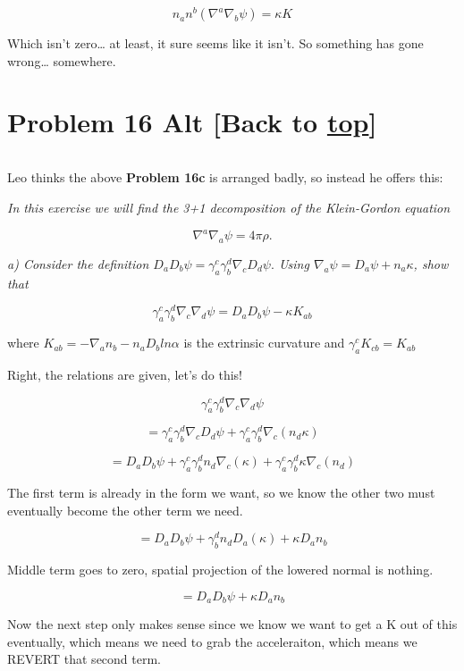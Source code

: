 \documentclass[landscape,letterpaper,10pt,english]{article}
\begin{document}
\[ n_a n^b (\nabla^a\nabla_b \psi) = \kappa K\]

Which isn't zero\ldots{} at least, it sure seems like it isn't. So
something has gone wrong\ldots{} somewhere.

    \hypertarget{problem-16-alt-back-to-top}{%
\section{\texorpdfstring{Problem 16 Alt {[}Back to
\hyperref[toc]{top}{]}}{Problem 16 Alt {[}Back to {]}}}\label{problem-16-alt-back-to-top}}

\[\label{P16A}\]

Leo thinks the above \textbf{Problem 16c} is arranged badly, so instead
he offers this:

    \emph{In this exercise we will find the 3+1 decomposition of the
Klein-Gordon equation}

\[ \nabla^a\nabla_a\psi = 4\pi \rho .\]

\emph{a) Consider the definition
\(D_aD_b\psi = \gamma^c_a\gamma^d_b\nabla_cD_d\psi.\) Using
\(\nabla_a\psi = D_a\psi + n_a \kappa\), show that}

\[ \gamma^c_a \gamma^d_b \nabla_c \nabla_d \psi = D_a D_b \psi - \kappa K_{ab} \]

where \(K_{ab} = -\nabla_an_b - n_aD_b ln\alpha\) is the extrinsic
curvature and \(\gamma^c_a K_{cb} = K_{ab}\)

    Right, the relations are given, let's do this!

\[ \gamma^c_a \gamma^d_b \nabla_c \nabla_d \psi \]

\[ = \gamma^c_a \gamma^d_b \nabla_c D_d \psi + \gamma^c_a \gamma^d_b \nabla_c (n_d \kappa) \]

\[ = D_a D_b \psi + \gamma^c_a \gamma^d_b n_d \nabla_c (\kappa) + \gamma^c_a \gamma^d_b \kappa \nabla_c (n_d) \]

The first term is already in the form we want, so we know the other two
must eventually become the other term we need.

\[ = D_a D_b \psi + \gamma^d_b n_d D_a(\kappa) +  \kappa D_a n_b\]

Middle term goes to zero, spatial projection of the lowered normal is
nothing.

\[ = D_a D_b \psi + \kappa D_a n_b\]

Now the next step only makes sense since we know we want to get a K out
of this eventually, which means we need to grab the acceleraiton, which
means we REVERT that second term.
\end{document}
